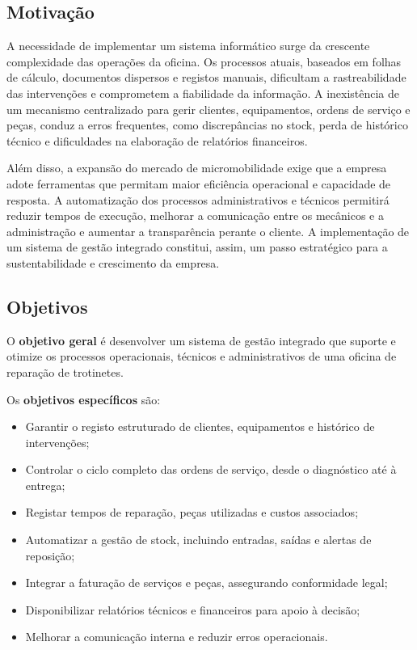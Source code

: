\documentclass[a4paper,12pt]{scrreprt}
\begin{document}
\subsection{Motivação}

A necessidade de implementar um sistema informático surge da crescente complexidade das operações da oficina. Os processos atuais, baseados em folhas de cálculo, documentos dispersos e registos manuais, dificultam a rastreabilidade das intervenções e comprometem a fiabilidade da informação. A inexistência de um mecanismo centralizado para gerir clientes, equipamentos, ordens de serviço e peças, conduz a erros frequentes, como discrepâncias no stock, perda de histórico técnico e dificuldades na elaboração de relatórios financeiros.

Além disso, a expansão do mercado de micromobilidade exige que a empresa adote ferramentas que permitam maior eficiência operacional e capacidade de resposta. A automatização dos processos administrativos e técnicos permitirá reduzir tempos de execução, melhorar a comunicação entre os mecânicos e a administração e aumentar a transparência perante o cliente. A implementação de um sistema de gestão integrado constitui, assim, um passo estratégico para a sustentabilidade e crescimento da empresa.

\subsection{Objetivos}

O \textbf{objetivo geral} é desenvolver um sistema de gestão integrado que suporte e otimize os processos operacionais, técnicos e administrativos de uma oficina de reparação de trotinetes.

Os \textbf{objetivos específicos} são:
\begin{itemize}
	\item Garantir o registo estruturado de clientes, equipamentos e histórico de intervenções;
	\item Controlar o ciclo completo das ordens de serviço, desde o diagnóstico até à entrega;
	\item Registar tempos de reparação, peças utilizadas e custos associados;
	\item Automatizar a gestão de stock, incluindo entradas, saídas e alertas de reposição;
	\item Integrar a faturação de serviços e peças, assegurando conformidade legal;
	\item Disponibilizar relatórios técnicos e financeiros para apoio à decisão;
	\item Melhorar a comunicação interna e reduzir erros operacionais.
\end{itemize}
\end{document}

